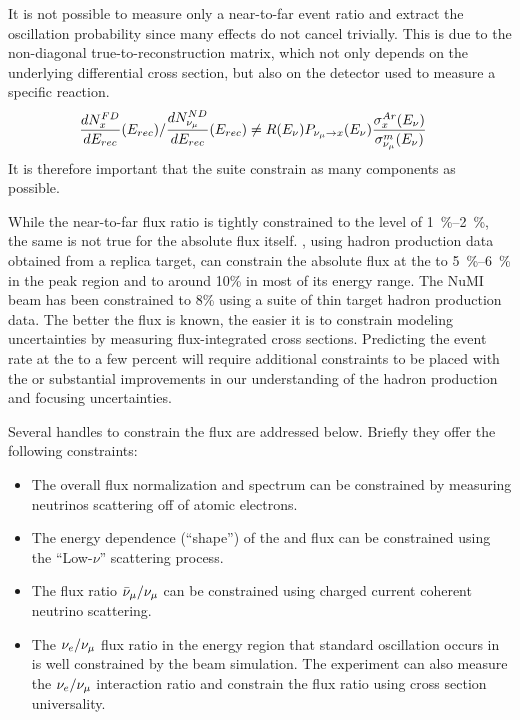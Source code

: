 It is not possible to measure only a near-to-far event ratio and extract the oscillation probability since many effects do not cancel trivially.  This is due to the non-diagonal true-to-reconstruction matrix, which not only depends on the underlying differential cross section, but also on the detector used to measure a specific reaction.
\begin{align*}
\frac{dN^{FD}_{x}}{dE_{rec}}(E_{rec})/{\frac{dN^{ND}_{\nu_\mu}}{dE_{rec}}(E_{rec})} & \neq  R(E_\nu)P_{\nu_\mu\rightarrow x}(E_\nu)\frac{\sigma^{Ar}_x(E_\nu)}{\sigma^{m}_{\nu_\mu}(E_\nu)}
\end{align*}
It is therefore important that the   suite constrain as many components as possible.


While the near-to-far flux ratio is tightly constrained to the level of \SIrange{1}{2}{\%}, the same is not true for the absolute flux itself. , using hadron production data obtained from a replica target, can constrain the absolute flux at the   to \SIrange{5}{6}{\%} in the peak region and to around 10\% in most of its energy range. The NuMI beam has been constrained to 8\% using a suite of thin target hadron production data. The better the  flux is known, the easier it is to constrain modeling uncertainties by measuring flux-integrated cross sections. Predicting the event rate at the   to a few percent will require additional constraints to be placed with the   or substantial improvements in our understanding of the hadron production and focusing uncertainties. 

Several handles to constrain the flux %
are addressed below. Briefly they offer the following constraints:

\begin{itemize}
    \item The overall flux normalization and spectrum can be constrained by measuring neutrinos scattering off of atomic electrons.
    \item The energy dependence (``shape'') of the \numu and \anumu %
     flux can be constrained using the ``Low-$\nu$'' scattering process.
    \item The flux ratio $\bar\nu_\mu/\nu_\mu$ can be constrained using charged current coherent neutrino scattering.
    \item The $\nu_e/\nu_\mu$ flux ratio in the energy region that standard oscillation occurs in is well constrained by the beam simulation. The experiment can also measure the $\nu_e/\nu_\mu$ interaction ratio and constrain the flux ratio using cross section universality.
\end{itemize}


